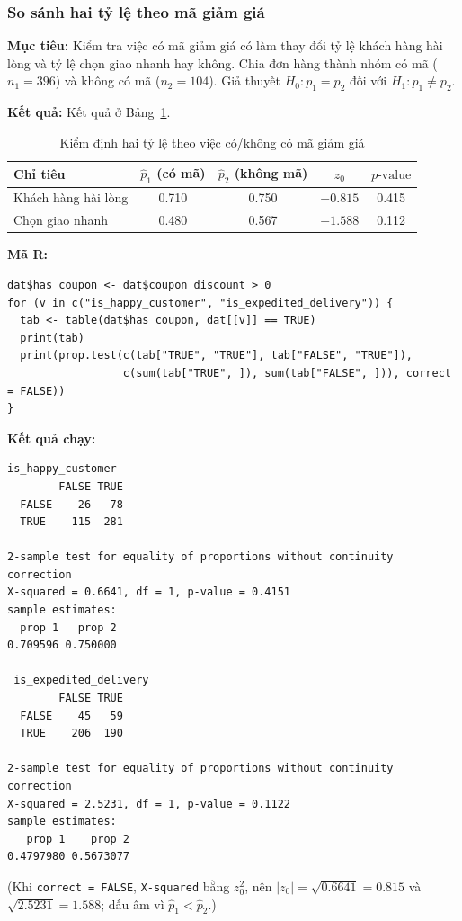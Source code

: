 \subsubsection{So sánh hai tỷ lệ theo mã giảm giá}
\textbf{Mục tiêu:} Kiểm tra việc có mã giảm giá có làm thay đổi tỷ lệ khách hàng hài lòng và tỷ lệ chọn giao nhanh hay không. Chia đơn hàng thành nhóm có mã ($n_1 = 396$) và không có mã ($n_2 = 104$). Giả thuyết $H_0: p_1 = p_2$ đối với $H_1: p_1 \ne p_2$.

\textbf{Kết quả:} Kết quả ở Bảng~\ref{tab:hai_tyle}.
\begin{table}[H]
    \centering
    \begin{tabular}{|l|c|c|c|c|}
    \hline
    \textbf{Chỉ tiêu} & $\hat p_1$ (có mã) & $\hat p_2$ (không mã) & $z_0$ & $p\text{-value}$ \\ \hline
    Khách hàng hài lòng & 0.710 & 0.750 & $-0.815$ & 0.415 \\ \hline
    Chọn giao nhanh & 0.480 & 0.567 & $-1.588$ & 0.112 \\ \hline
    \end{tabular}
    \caption{Kiểm định hai tỷ lệ theo việc có/không có mã giảm giá}
    \label{tab:hai_tyle}
\end{table}

\textbf{Mã R:}
\begin{lstlisting}
dat$has_coupon <- dat$coupon_discount > 0
for (v in c("is_happy_customer", "is_expedited_delivery")) {
  tab <- table(dat$has_coupon, dat[[v]] == TRUE)
  print(tab)
  print(prop.test(c(tab["TRUE", "TRUE"], tab["FALSE", "TRUE"]),
                  c(sum(tab["TRUE", ]), sum(tab["FALSE", ])), correct = FALSE))
}
\end{lstlisting}
\textbf{Kết quả chạy:}
\begin{lstlisting}[style=rout]
 is_happy_customer 
        FALSE TRUE
  FALSE    26   78
  TRUE    115  281

2-sample test for equality of proportions without continuity correction
X-squared = 0.6641, df = 1, p-value = 0.4151
sample estimates:
  prop 1   prop 2 
0.709596 0.750000 

 is_expedited_delivery 
        FALSE TRUE
  FALSE    45   59
  TRUE    206  190

2-sample test for equality of proportions without continuity correction
X-squared = 2.5231, df = 1, p-value = 0.1122
sample estimates:
   prop 1    prop 2 
0.4797980 0.5673077 
\end{lstlisting}
(Khi \texttt{correct = FALSE}, \texttt{X-squared} bằng $z_0^2$, nên $|z_0| = \sqrt{0.6641} = 0.815$ và $\sqrt{2.5231} = 1.588$; dấu âm vì $\hat p_1 < \hat p_2$.)

